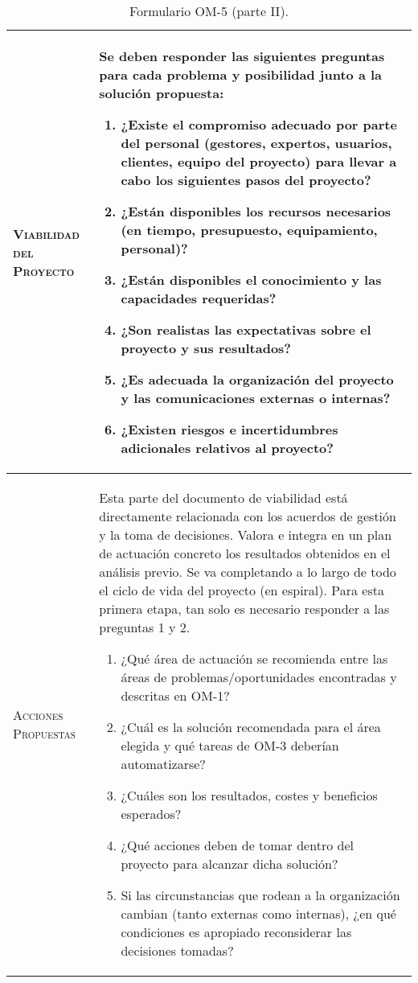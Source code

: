 \documentclass[12pt,a4paper,twoside,spanish]{article}      %
\begin{document}
\begin{table}[H]
\begin{tabularx}{\textwidth}{|l|X|}
\textsc{Viabilidad del Proyecto} & Se deben responder las siguientes preguntas para cada problema y posibilidad junto
a la solución propuesta:
\begin{enumerate}
    \item ¿Existe el compromiso adecuado por parte del personal (gestores, expertos,
usuarios, clientes, equipo del proyecto) para llevar a cabo los siguientes pasos
del proyecto?
    \item ¿Están disponibles los recursos necesarios (en tiempo, presupuesto,
equipamiento, personal)?
    \item ¿Están disponibles el conocimiento y las capacidades requeridas?
    \item ¿Son realistas las expectativas sobre el proyecto y sus resultados?
    \item ¿Es adecuada la organización del proyecto y las comunicaciones externas o
internas?
    \item ¿Existen riesgos e incertidumbres adicionales relativos al proyecto?
\end{enumerate}
\\ \hline
\textsc{Acciones Propuestas} & Esta parte del documento de viabilidad está directamente relacionada con los acuerdos de gestión y la toma de decisiones. Valora e
integra en un plan de
actuación concreto los resultados obtenidos en el análisis previo. Se va completando a lo largo de todo el ciclo de vida del proyecto (en espiral). Para esta primera etapa, tan solo es necesario responder a las preguntas 1 y 2.  
\begin{enumerate}
    \item ¿Qué área de actuación se recomienda entre las áreas de problemas/oportunidades encontradas y descritas en OM-1?
    \item ¿Cuál es la solución recomendada para el área elegida y qué tareas de OM-3 deberían automatizarse?
    \item ¿Cuáles son los resultados, costes y beneficios esperados?
    \item ¿Qué acciones deben de tomar dentro del proyecto para alcanzar dicha
solución?
    \item Si las circunstancias que rodean a la organización cambian (tanto externas como
internas), ¿en qué condiciones es apropiado reconsiderar las decisiones
tomadas?
\end{enumerate}
\\ \hline
\end{tabularx}
\caption{Formulario OM-5 (parte II).}
  \label{tab.OM5_2}
\end{table}
\end{document}
